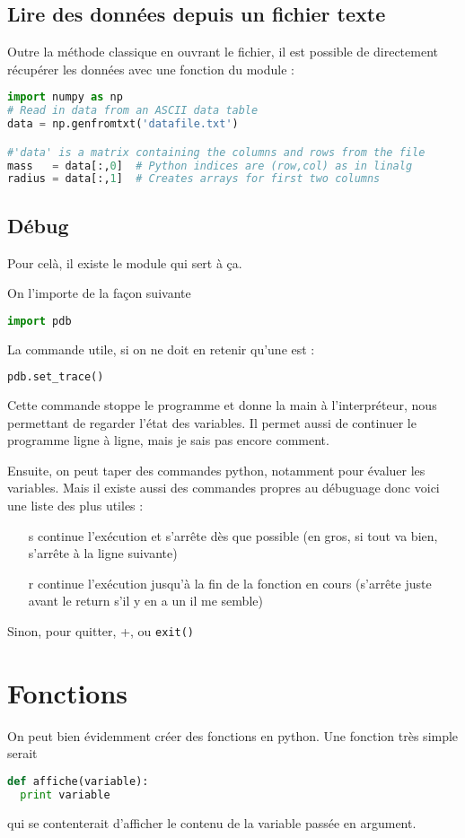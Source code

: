 \documentclass[a4paper,twoside]{article}
\begin{document}
\subsection{Lire des données depuis un fichier texte}
Outre la méthode classique en ouvrant le fichier, il est possible de directement récupérer les données avec une fonction du module  : 
\begin{lstlisting}[language=python]
import numpy as np
# Read in data from an ASCII data table
data = np.genfromtxt('datafile.txt')

#'data' is a matrix containing the columns and rows from the file
mass   = data[:,0]  # Python indices are (row,col) as in linalg
radius = data[:,1]  # Creates arrays for first two columns
\end{lstlisting}


\subsection{Débug}
Pour celà, il existe le module  qui sert à ça.

On l'importe de la façon suivante
\begin{lstlisting}[language=python]
import pdb
\end{lstlisting}

La commande utile, si on ne doit en retenir qu'une est :
\begin{lstlisting}[language=python]
pdb.set_trace()
\end{lstlisting}

Cette commande stoppe le programme et donne la main à l'interpréteur, nous permettant de regarder l'état des variables. Il permet aussi de continuer le programme ligne à ligne, mais je sais pas encore comment.

Ensuite, on peut taper des commandes python, notamment pour évaluer les variables. Mais il existe aussi des commandes propres au débuguage donc voici une liste des plus utiles :
\begin{itemize}
\item[s] continue l'exécution et s'arrête dès que possible (en gros, si tout va bien, s'arrête à la ligne suivante)
\item[r] continue l'exécution jusqu'à la fin de la fonction en cours (s'arrête juste avant le return s'il y en a un il me semble)
\end{itemize}
Sinon, pour quitter, +, ou \texttt{exit()}

\section{Fonctions}
On peut bien évidemment créer des fonctions en python. Une fonction très simple serait
\begin{lstlisting}[language=python]
def affiche(variable):
  print variable
\end{lstlisting}
qui se contenterait d'afficher le contenu de la variable passée en argument.
\end{document}
